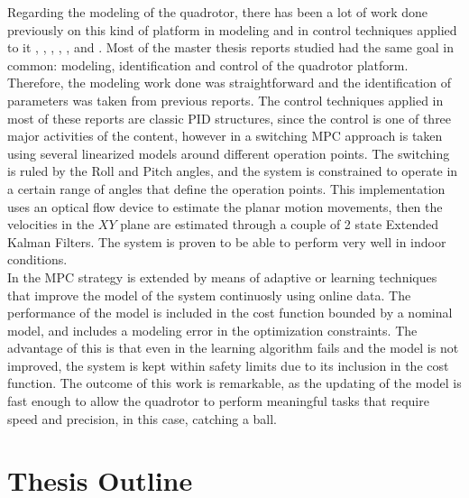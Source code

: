 Regarding the modeling of the quadrotor, there has been a lot of work done previously on this kind of platform in modeling and in control techniques applied to it \cite{Bouabdallah2004},  \cite{Bresciani2008}, \cite{Lellis}, \cite{Raffo2007}, \cite{Salih2010}, \cite{YueSun2012} and \cite{MahoneyKumarCorke2012}. Most of the master thesis reports studied had the same goal in common: modeling, identification and control of the quadrotor platform. Therefore, the modeling work done was straightforward and the identification of parameters was taken from previous reports. The control techniques applied in most of these reports are classic PID structures, since the control is one of three major activities of the content, however in \cite{Alexis2011} a switching MPC approach is taken using several linearized models around different operation points. The switching is ruled by the Roll and Pitch angles, and the system is constrained to operate in a certain range of angles that define the operation points. This implementation uses an optical flow device to estimate the planar motion movements, then the velocities in the $XY$ plane are estimated through a couple of 2 state Extended Kalman Filters. The system is proven to be able to perform very well in indoor conditions.\\

In \cite{Bouffard2012} the MPC strategy is extended by means of adaptive or learning techniques that improve the model of the system continuosly using online data. The performance of the model is included in the cost function bounded by a nominal model, and includes a modeling error in the optimization constraints. The advantage of this is that even in the learning algorithm fails and the model is not improved, the system is kept within safety limits due to its inclusion in the cost function. The outcome of this work is remarkable, as the updating of the model is fast enough to allow the quadrotor to perform meaningful tasks that require speed and precision, in this case, catching a ball.

\section{Thesis Outline}

